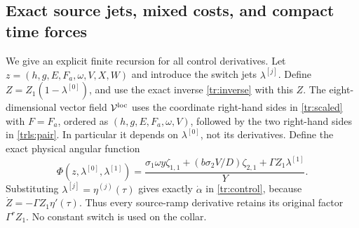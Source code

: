 \subsection{Exact source jets, mixed costs, and compact time forces}

We give an explicit finite recursion for all control derivatives.
Let $z=(h,g,E,F_a,\omega,V,X,W)$ and introduce the switch jets
$\lambda^{[j]}$. Define $Z=Z_1(1-\lambda^{[0]})$,
and use the exact inverse \eqref{tr:inverse} with this $Z$.
The eight-dimensional vector field $\mathcal V^{\rm loc}$
uses the coordinate right-hand sides in \eqref{tr:scaled}
with $F=F_a$, ordered as $(h,g,E,F_a,\omega,V)$,
followed by the two right-hand sides in \eqref{trls:pair}.
In particular it depends
on $\lambda^{[0]}$, not its derivatives. Define the exact
physical angular function
\begin{equation}\label{trls:controlfunction}
 \Phi(z,\lambda^{[0]},\lambda^{[1]})
  =\frac{\sigma_1\omega y\zeta_{1,1}
           +(b\sigma_2V/D)\zeta_{2,1}
           +\Gamma Z_1\lambda^{[1]}}{Y}.
\end{equation}
Substituting $\lambda^{[j]}=\eta^{(j)}(\tau)$ gives
exactly $\dot\alpha$ in \eqref{tr:control}, because
$\dot Z=-\Gamma Z_1\eta'(\tau)$.
Thus every source-ramp derivative retains its original factor
$\Gamma^rZ_1$. No constant switch is used on the collar.

